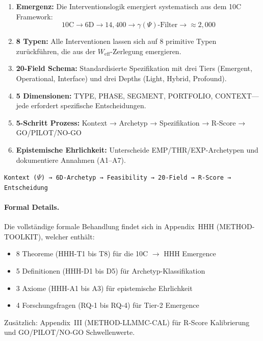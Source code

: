 \begin{tcolorbox}[colback=green!5!white, colframe=green!75!black,
    title=Key Points]

\begin{enumerate}
\item \textbf{Emergenz:} Die Interventionslogik emergiert systematisch aus dem 10C Framework:
\begin{equation}
\text{10C} \rightarrow \text{6D} \rightarrow 14{,}400 \rightarrow \gamma(\Psi)\text{-Filter} \rightarrow \approx 2{,}000
\end{equation}

\item \textbf{8 Typen:} Alle Interventionen lassen sich auf 8 primitive Typen zurückführen, die aus der $W_{\text{eff}}$-Zerlegung emergieren.

\item \textbf{20-Field Schema:} Standardisierte Spezifikation mit drei Tiers (Emergent, Operational, Interface) und drei Depths (Light, Hybrid, Profound).

\item \textbf{5 Dimensionen:} TYPE, PHASE, SEGMENT, PORTFOLIO, CONTEXT---jede erfordert spezifische Entscheidungen.

\item \textbf{5-Schritt Prozess:} Kontext → Archetyp → Spezifikation → R-Score → GO/PILOT/NO-GO

\item \textbf{Epistemische Ehrlichkeit:} Unterscheide EMP/THR/EXP-Archetypen und dokumentiere Annahmen (A1--A7).
\end{enumerate}

\end{tcolorbox}

\begin{tcolorbox}[colback=blue!5!white, colframe=blue!75!black,
    title=Der Interventions-Workflow auf einen Blick]

\begin{center}
\texttt{Kontext ($\Psi$) → 6D-Archetyp → Feasibility → 20-Field → R-Score → Entscheidung}
\end{center}

\end{tcolorbox}

\paragraph{Formal Details.}
Die vollständige formale Behandlung findet sich in Appendix~HHH (METHOD-TOOLKIT), welcher enthält:
\begin{itemize}[nosep]
\item 8 Theoreme (HHH-T1 bis T8) für die 10C $\rightarrow$ HHH Emergence
\item 5 Definitionen (HHH-D1 bis D5) für Archetyp-Klassifikation
\item 3 Axiome (HHH-A1 bis A3) für epistemische Ehrlichkeit
\item 4 Forschungsfragen (RQ-1 bis RQ-4) für Tier-2 Emergence
\end{itemize}
Zusätzlich: Appendix~III (METHOD-LLMMC-CAL) für R-Score Kalibrierung und GO/PILOT/NO-GO Schwellenwerte.

